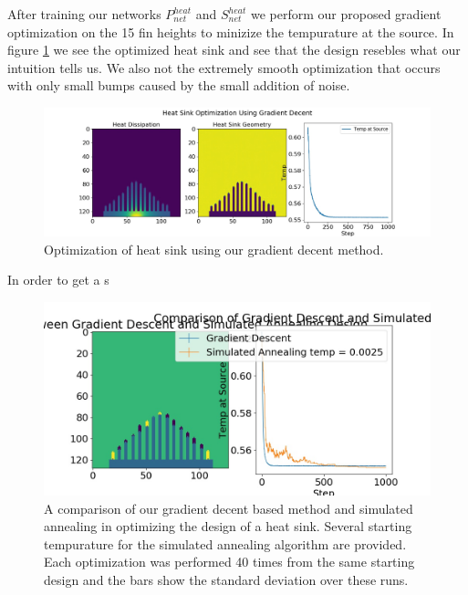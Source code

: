 \documentclass{article} %
\begin{document}
After training our networks $P^{heat}_{net}$ and $S^{heat}_{net}$ we perform our proposed gradient optimization on the 15 fin heights to minizize the tempurature at the source. In figure \ref{heat_sink_optimization} we see the optimized heat sink and see that the design resebles what our intuition tells us. We also not the extremely smooth optimization that occurs with only small bumps caused by the small addition of noise.

\begin{figure}[!t]
\begin{center}
\includegraphics[scale=0.30]{../test/figs/heat_learn_gradient_decent.jpeg}
\end{center}
\caption{Optimization of heat sink using our gradient decent method.}
\label{heat_sink_optimization}
\end{figure}

In order to get a s

\begin{figure}[h]
\begin{center}
\includegraphics[scale=0.30]{../test/figs/heat_learn_comparison.jpeg}
\end{center}
\caption{A comparison of our gradient decent based method and simulated annealing in optimizing the design of a heat sink. Several starting tempurature for the simulated annealing algorithm are provided. Each optimization was performed 40 times from the same starting design and the bars show the standard deviation over these runs.}
\end{figure}
\end{document}
